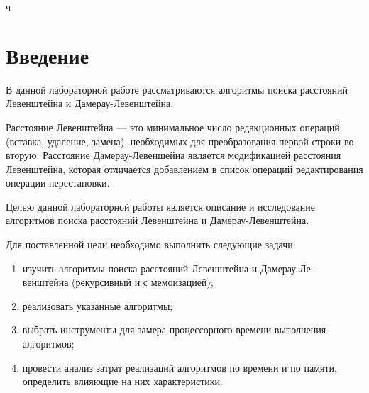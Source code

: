 ч\chapter*{Введение}

В данной лабораторной работе рассматриваются алгоритмы поиска расстояний Левенштейна и Дамерау-Левенштейна.

Расстояние Левенштейна --- это минимальное число редакционных операций (вставка, удаление, замена), необходимых для преобразования первой строки во вторую. Расстояние Дамерау-Левеншейна является модификацией расстояния Левенштейна, которая отличается добавлением в список операций редактирования операции перестановки.



Целью данной лабораторной работы является описание и исследование алгоритмов поиска расстояний Левенштейна и Дамерау-Левенштейна.

Для поставленной цели необходимо выполнить следующие задачи:
\begin{enumerate}[label=---]
	\item изучить алгоритмы поиска расстояний Левенштейна и Дамерау-Ле-\\венштейна (рекурсивный и с мемоизацией);
	\item реализовать указанные алгоритмы;
	\item выбрать инструменты для замера процессорного времени выполнения алгоритмов;
	\item провести анализ затрат реализаций алгоритмов по времени и по памяти, определить влияющие на них характеристики.
\end{enumerate}